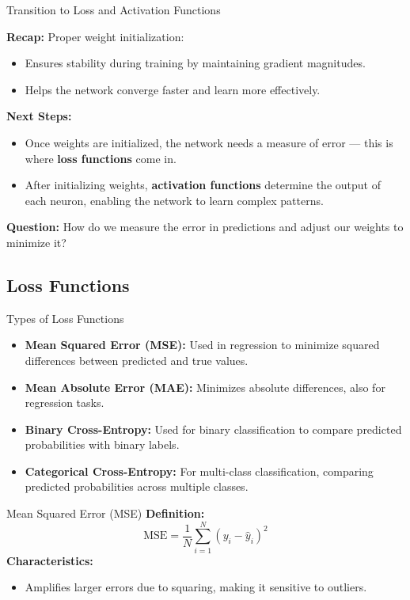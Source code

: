 \documentclass[serif, aspectratio=169]{beamer}
\begin{document}
\begin{frame}{Transition to Loss and Activation Functions}

    \textbf{Recap:} Proper weight initialization:
    \begin{itemize}
        \item Ensures stability during training by maintaining gradient magnitudes.
        \item Helps the network converge faster and learn more effectively.
    \end{itemize}
    
    \textbf{Next Steps:}
    \begin{itemize}
        \item Once weights are initialized, the network needs a measure of error — this is where \textbf{loss functions} come in.
        \item After initializing weights, \textbf{activation functions} determine the output of each neuron, enabling the network to learn complex patterns.
    \end{itemize}
    
    \textbf{Question:} How do we measure the error in predictions and adjust our weights to minimize it?
    
\end{frame}


\subsection{Loss Functions}

\begin{frame}{Types of Loss Functions}
    \begin{itemize}
        \item \textbf{Mean Squared Error (MSE):} Used in regression to minimize squared differences between predicted and true values.
        \item \textbf{Mean Absolute Error (MAE):} Minimizes absolute differences, also for regression tasks.
        \item \textbf{Binary Cross-Entropy:} Used for binary classification to compare predicted probabilities with binary labels.
        \item \textbf{Categorical Cross-Entropy:} For multi-class classification, comparing predicted probabilities across multiple classes.
    \end{itemize}
\end{frame}

\begin{frame}{Mean Squared Error (MSE)}
    \textbf{Definition:}
    \[
    \text{MSE} = \frac{1}{N} \sum_{i=1}^{N} \left( y_i - \hat{y}_i \right)^2
    \]
    \textbf{Characteristics:}
    \begin{itemize}
        \item Amplifies larger errors due to squaring, making it sensitive to outliers.
    \end{itemize}
\end{frame}
\end{document}
